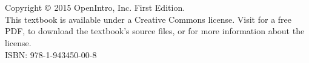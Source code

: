 \chapter*{}
\vfill

\noindent Copyright $\copyright$ 2015 OpenIntro, Inc. First Edition. \\

\noindent This textbook is available under a Creative Commons license. %
Visit  for a free PDF, to download the textbook's source files, or for more information about the license. \\


\noindent ISBN: 978-1-943450-00-8 \\

